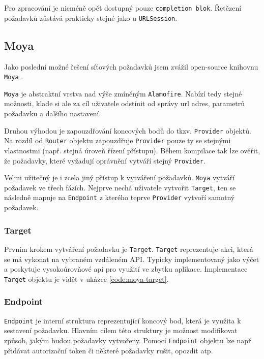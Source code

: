 Pro zpracování je nicméně opět dostupný pouze \texttt{completion blok}.
Řetězení požadavků zůstává prakticky stejné jako u \texttt{URLSession}.

\subsection{Moya}

Jako poslední možné řešení síťových požadavků jsem zvážil open-source knihovnu \texttt{Moya} \cite{github-moya}.

\texttt{Moya} je abstraktní vrstva nad výše zmíněným \texttt{Alamofire}.
Nabízí tedy stejné možnosti, klade si ale za cíl uživatele odstínit od správy \acrshort{url} adres, parametrů požadavku a dalšího nastavení.

Druhou výhodou je zapouzdřování koncových bodů do tkzv. \texttt{Provider} objektů.
Na rozdíl od \texttt{Router} objektu zapouzdřuje \texttt{Provider} pouze ty se stejnými vlastnostmi (např. stejná úroveň řízení přístupu).
Během kompilace tak lze ověřit, že požadavky, které vyžadují oprávnění vytváří stejný \texttt{Provider}.

\medskip

Velmi užitečný je i zcela jiný přístup k vytváření požadavků.
\texttt{Moya} vytváří požadavek ve třech fázích.
Nejprve nechá uživatele vytvořit \texttt{Target}, ten se následně mapuje na \texttt{Endpoint} z kterého teprve \texttt{Provider} vytvoří samotný požadavek.

\subsubsection*{Target}

Prvním krokem vytváření požadavku je \texttt{Target}.
\texttt{Target} reprezentuje akci, která se má vykonat na vybraném vzdáleném API.
Typicky implementovaný jako výčet a poskytuje vysokoúrovňové \acrshort{api} pro využití ve zbytku aplikace.
Implementace \texttt{Target} objektu je vidět v ukázce \ref{code:moya-target}.


\subsubsection*{Endpoint}

\texttt{Endpoint} je interní struktura reprezentující koncový bod, která je využita k sestavení požadavku.
Hlavním cílem této struktury je možnost modifikovat způsob, jakým budou požadavky vytvořeny.
Pomocí \texttt{Endpoint} objektu lze např. přidávat autorizační token či některé požadavky rušit, opozdit atp.

